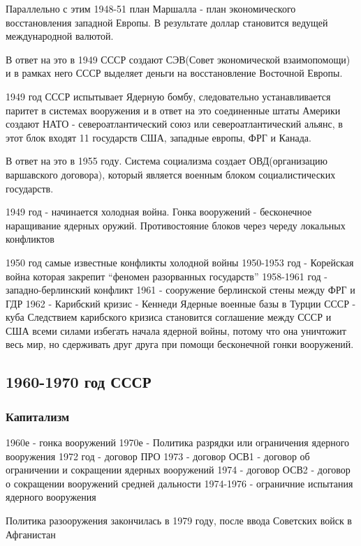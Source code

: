 \documentclass[a4paper]{article}
\begin{document}
Параллельно с этим 1948-51 план Маршалла - план экономического восстановления западной Европы. В результате доллар становится ведущей международной валютой.

В ответ на это в 1949 СССР создают СЭВ(Совет экономической взаимопомощи) и в рамках него СССР выделяет деньги на восстановление Восточной Европы.

1949 год СССР испытывает Ядерную бомбу, следовательно устанавливается паритет в системах вооружения и в ответ на это соединенные штаты Америки создают НАТО - североатлантический союз или североатлантический альянс, в этот блок входят 11 государств США, западные европы, ФРГ и Канада.

В ответ на это в 1955 году. Система социализма создает ОВД(организацию варшавского договора), который является военным блоком социалистических государств.

1949 год - начинается холодная война. Гонка вооружений - бесконечное наращивание ядерных оружий. Противостояние блоков через череду локальных конфликтов

1950 год самые известные конфликты холодной войны
1950-1953 год - Корейская война которая закрепит ``феномен разорванных государств''
1958-1961 год - западно-берлинский конфликт
1961 - сооружение берлинской стены между ФРГ и ГДР
1962 - Карибский кризис - Кеннеди Ядерные военные базы в Турции
                        СССР - куба
Следствием карибского кризиса становится соглашение между СССР и США всеми силами избегать начала ядерной войны, потому что она уничтожит весь мир, но сдерживать друг друга при помощи бесконечной гонки вооружений.

\subsection{1960-1970 год СССР}

\subsubsection{Капитализм}

1960е - гонка вооружений
1970е - Политика разрядки или ограничения ядерного вооружения
1972 год - договор ПРО
1973 - договор ОСВ1 - договор об ограничении и сокращении ядерных вооружений
1974 - договор ОСВ2 - договор о сокращении вооружений средней дальности
1974-1976 - ограничние испытания ядерного вооружения

Политика разооружения закончилась в 1979 году, после ввода Советских войск в Афганистан
\end{document}
